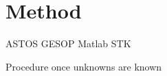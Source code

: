 \chapter{Method} \label{cha:Method}


ASTOS
GESOP
Matlab
STK

Procedure once unknowns are known
  
\clearpage